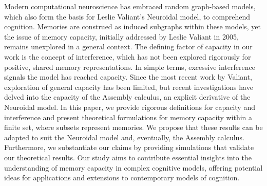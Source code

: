 Modern computational neuroscience has embraced random graph-based models, which also form the basis for Leslie Valiant's Neuroidal model, to comprehend cognition. Memories are construed as induced subgraphs within these models, yet the issue of memory capacity, initially addressed by Leslie Valiant in 2005, remains unexplored in a general context. The defining factor of capacity in our work is the concept of interference, which has not been explored rigorously for positive, shared memory representations. In simple terms, excessive interference signals the model has reached capacity. Since the most recent work by Valiant, exploration of general capacity has been limited, but recent investigations have delved into the capacity of the Assembly calculus, an explicit derivative of the Neuroidal model. In this paper, we provide rigorous definitions for capacity and interference and present theoretical formulations for memory capacity within a finite set, where subsets represent memories. We propose that these results can be adapted to suit the Neuroidal model and, eventually, the Assembly calculus. Furthermore, we substantiate our claims by providing simulations that validate our theoretical results. Our study aims to contribute essential insights into the understanding of memory capacity in complex cognitive models, offering potential ideas for applications and extensions to contemporary models of cognition. 
